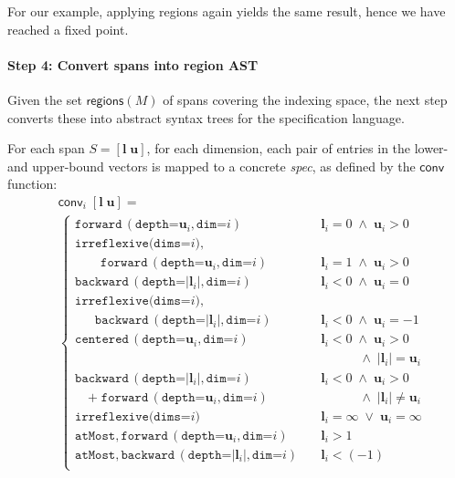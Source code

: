 \documentclass[9pt]{sigplanconf}
\theoremstyle{definition}
\newcommand{\term}[1]{\texttt{#1}}
\newcommand{\stenFwd}[2]{\term{forward} \, (\term{depth=}#1,
  \term{dim=}#2)}
\newcommand{\stenBwd}[2]{\term{backward} \, (\term{depth=}#1,
  \term{dim=}#2)}
\newcommand{\stenCen}[2]{\term{centered} \, (\term{depth=}#1,
  \term{dim=}#2)}
\newcommand{\vect}[1]{\textbf{#1}}
\begin{document}
For our example, applying \textsf{regions} again yields the same
result, hence we have reached a fixed point.

\paragraph{Step 4: Convert spans into region AST}

Given the set $\textsf{regions}(M)$ of spans covering the indexing
space, the next step converts these into abstract syntax trees
for the specification language.

For each span $S = [\vect{l} \; \vect{u}]$,
for each dimension, each pair of entries in the lower- and upper-bound
vectors is mapped to a concrete \textit{spec}, as defined by the
$\mathsf{conv}$ function:
\begin{align*}
& \mathsf{conv}_i\; [\vect{l} \; \vect{u}] = \\
& \begin{cases}
 \stenFwd{\vect{u}_i}{i}  & \vect{l}_i = 0 \; \wedge \; \vect{u}_i > 0 \\[0.7em]
 \texttt{irreflexive(dims=$i$)}, & \\
 \qquad \stenFwd{\vect{u}_i}{i}  & \vect{l}_i = 1 \; \wedge \; \vect{u}_i > 0 \\[0.7em]
 \stenBwd{|\vect{l}_i|}{i}  & \vect{l}_i < 0 \; \wedge \; \vect{u}_i = 0 \\[0.7em]
 \texttt{irreflexive(dims=$i$)}, & \\
 \quad\;\; \stenBwd{|\vect{l}_i|}{i}  & \vect{l}_i < 0 \; \wedge \; \vect{u}_i = -1 \\[0.7em]
 \stenCen{\vect{u}_i}{i}  &\vect{l}_i < 0 \; \wedge \; \vect{u}_i > 0
 \; \\
 & \qquad\quad \wedge \; |\vect{l}_i| = \vect{u}_i \\[0.7em]
 \stenBwd{|\vect{l}_i|}{i} & \vect{l}_i < 0 \; \wedge \; \vect{u}_i >
 0 \\
\quad \texttt{+} \; \stenFwd{\vect{u}_i}{i}  & \qquad\quad \wedge \; |\vect{l}_i| \neq \vect{u}_i \\[0.7em]
 \texttt{irreflexive(dims=$i$)} & \vect{l}_i = \infty \; \vee \; \vect{u}_i
 = \infty \\[0.7em]
 \texttt{atMost}, \stenFwd{\vect{u}_i}{i} & \vect{l}_i > 1 \\[0.7em]
 \texttt{atMost}, \stenBwd{|\vect{l}_i|}{i} \quad & \vect{l}_i < (-1) \\[0.7em]
  \end{cases}
\end{align*}
\end{document}
